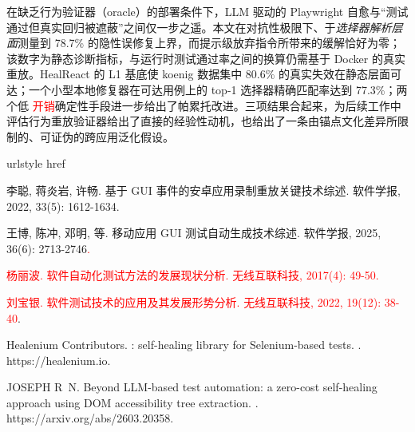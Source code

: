 \documentclass[UTF8, a4paper, 10.5pt, twocolumn, fontset=none]{ctexart}
\providecommand{\DIFaddbegin}{} %
\providecommand{\DIFaddend}{} %
\providecommand{\DIFaddtex}[1]{\textcolor{red}{#1}} %
\providecommand{\DIFadd}[1]{\texorpdfstring{\DIFaddtex{#1}}{#1}} %
\providecommand{\DIFaddincludegraphics}[2][]{{\color{blue}\fbox{\DIFOincludegraphics[#1]{#2}}}} %
\DeclareRobustCommand{\DIFaddbegin}{\DIFOaddbegin \let\includegraphics\DIFaddincludegraphics} %
\DeclareRobustCommand{\DIFaddend}{\DIFOaddend \let\includegraphics\DIFOincludegraphics} %
\begin{document}
在缺乏行为验证器（oracle）的部署条件下，LLM 驱动的 Playwright 自愈与“测试通过但真实回归被遮蔽”之间仅一步之遥。本文在对抗性极限下、于\emph{选择器解析层面}测量到 78.7\% 的隐性误修复上界，而提示级放弃指令所带来的缓解恰好为零；该数字为静态诊断指标，与运行时测试通过率之间的换算仍需基于 Docker 的真实重放。HealReact 的 L1 基底使 koenig 数据集中 80.6\% 的真实失效在静态层面可达；一个小型本地修复器在可达用例上的 top-1 选择器精确匹配率达到 77.3\%；两个低 \DIFaddbegin \DIFadd{开销}\DIFaddend 确定性手段进一步给出了帕累托改进。三项结果合起来，为后续工作中评估行为重放验证器给出了直接的经验性动机，也给出了一条由锚点文化差异所限制的、可证伪的跨应用泛化假设。


\begingroup
\color{red}
 \DIFaddbegin \begin{thebibliography}{18}
\DIFaddend \providecommand{\natexlab}[1]{#1}
\providecommand{\url}[1]{#1}
\expandafter\ifx\csname urlstyle\endcsname\relax\else
  \fi
\expandafter\ifx\csname href\endcsname\relax
  \DeclareUrlCommand{}
  \def\eprint#1#2{#2}
\else
  \def\doi#1{\href{https://doi.org/#1}{\nolinkurl{#1}}}
  \let\eprint\href
\fi

李聪, 蒋炎岩, 许畅.
\newblock 基于 {GUI}
  事件的安卓应用录制重放关键技术综述\allowbreak[J].
\newblock 软件学报, 2022, 33\allowbreak (5): 1612-1634.

王博, 陈冲, 邓明, 等.
\newblock 移动应用 {GUI} 测试自动生成技术综述\allowbreak[J].
\newblock 软件学报, 2025, 36\allowbreak (6): 2713-2746\DIFaddbegin \DIFadd{.
}

\DIFadd{杨丽波.
}\newblock \DIFadd{软件自动化测试方法的发展现状分析}\allowbreak[J]\DIFadd{.
}\newblock \DIFadd{无线互联科技, 2017}\allowbreak \DIFadd{(4): 49-50.
}

\DIFadd{刘宝银.
}\newblock \DIFadd{软件测试技术的应用及其发展形势分析}\allowbreak[J]\DIFadd{.
}\newblock \DIFadd{无线互联科技, 2022, 19}\allowbreak \DIFadd{(12): 38-40}\DIFaddend .

{Healenium Contributors}.
: self-healing library for {Selenium}-based
  tests\allowbreak[EB/OL].
\allowbreak[2026-06-20].
\newblock \url{https://healenium.io}.

JOSEPH R~N.
\newblock Beyond {LLM}-based test automation: a zero-cost self-healing approach
  using {DOM} accessibility tree extraction\allowbreak[EB/OL].
\allowbreak[2026-06-20].
\newblock \url{https://arxiv.org/abs/2603.20358}.


\end{thebibliography}
\end{document}
